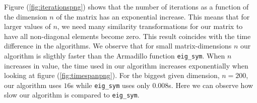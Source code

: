 \documentclass{article}
\begin{document}

  Figure (\ref{fig:iterationspng}) shows that the number of iterations as a function of the dimension $n$ of the matrix has an exponential increase. This means that for larger values of $n$, we need many similarity transformations for our matrix to have all non-diagonal elements become zero. This result coincides with the time difference in the algorithms. We observe that for small matrix-dimensions $n$ our algorithm is sligthly faster than the Armadillo function \texttt{eig\_sym}. When $n$ increases in value, the time used in our algorithm increases exponentially when looking at figure (\ref{fig:timespanpng}). For the biggest given dimension, $n = 200$, our algorithm uses $16$s while \texttt{eig\_sym} uses only $0.008$s. Here we can observe how slow our algorithm is compared to \texttt{eig\_sym}. \\
\end{document}
